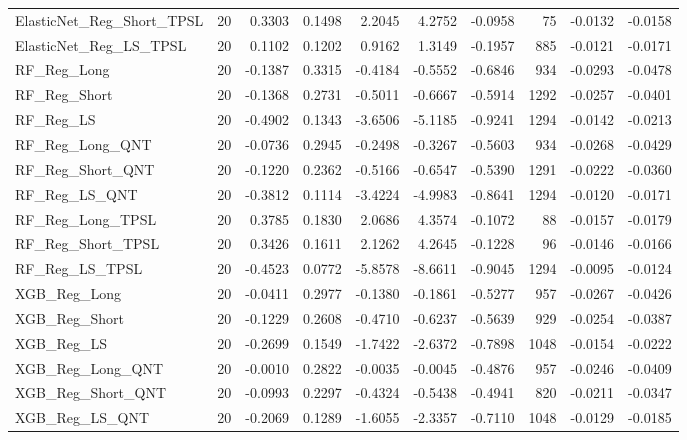 \begin{tabular}{llrrrrrrrr}
\cline{1-10}
ElasticNet\_Reg\_Short\_TPSL & 20 & 0.3303 & 0.1498 & 2.2045 & 4.2752 & -0.0958 & 75 & -0.0132 & -0.0158 \\
\cline{1-10}
ElasticNet\_Reg\_LS\_TPSL & 20 & 0.1102 & 0.1202 & 0.9162 & 1.3149 & -0.1957 & 885 & -0.0121 & -0.0171 \\
\cline{1-10}
RF\_Reg\_Long & 20 & -0.1387 & 0.3315 & -0.4184 & -0.5552 & -0.6846 & 934 & -0.0293 & -0.0478 \\
\cline{1-10}
RF\_Reg\_Short & 20 & -0.1368 & 0.2731 & -0.5011 & -0.6667 & -0.5914 & 1292 & -0.0257 & -0.0401 \\
\cline{1-10}
RF\_Reg\_LS & 20 & -0.4902 & 0.1343 & -3.6506 & -5.1185 & -0.9241 & 1294 & -0.0142 & -0.0213 \\
\cline{1-10}
RF\_Reg\_Long\_QNT & 20 & -0.0736 & 0.2945 & -0.2498 & -0.3267 & -0.5603 & 934 & -0.0268 & -0.0429 \\
\cline{1-10}
RF\_Reg\_Short\_QNT & 20 & -0.1220 & 0.2362 & -0.5166 & -0.6547 & -0.5390 & 1291 & -0.0222 & -0.0360 \\
\cline{1-10}
RF\_Reg\_LS\_QNT & 20 & -0.3812 & 0.1114 & -3.4224 & -4.9983 & -0.8641 & 1294 & -0.0120 & -0.0171 \\
\cline{1-10}
RF\_Reg\_Long\_TPSL & 20 & 0.3785 & 0.1830 & 2.0686 & 4.3574 & -0.1072 & 88 & -0.0157 & -0.0179 \\
\cline{1-10}
RF\_Reg\_Short\_TPSL & 20 & 0.3426 & 0.1611 & 2.1262 & 4.2645 & -0.1228 & 96 & -0.0146 & -0.0166 \\
\cline{1-10}
RF\_Reg\_LS\_TPSL & 20 & -0.4523 & 0.0772 & -5.8578 & -8.6611 & -0.9045 & 1294 & -0.0095 & -0.0124 \\
\cline{1-10}
XGB\_Reg\_Long & 20 & -0.0411 & 0.2977 & -0.1380 & -0.1861 & -0.5277 & 957 & -0.0267 & -0.0426 \\
\cline{1-10}
XGB\_Reg\_Short & 20 & -0.1229 & 0.2608 & -0.4710 & -0.6237 & -0.5639 & 929 & -0.0254 & -0.0387 \\
\cline{1-10}
XGB\_Reg\_LS & 20 & -0.2699 & 0.1549 & -1.7422 & -2.6372 & -0.7898 & 1048 & -0.0154 & -0.0222 \\
\cline{1-10}
XGB\_Reg\_Long\_QNT & 20 & -0.0010 & 0.2822 & -0.0035 & -0.0045 & -0.4876 & 957 & -0.0246 & -0.0409 \\
\cline{1-10}
XGB\_Reg\_Short\_QNT & 20 & -0.0993 & 0.2297 & -0.4324 & -0.5438 & -0.4941 & 820 & -0.0211 & -0.0347 \\
\cline{1-10}
XGB\_Reg\_LS\_QNT & 20 & -0.2069 & 0.1289 & -1.6055 & -2.3357 & -0.7110 & 1048 & -0.0129 & -0.0185 \\

\end{tabular}
